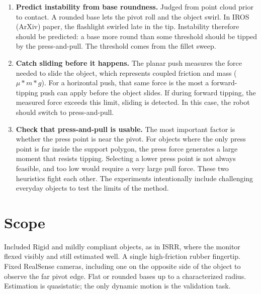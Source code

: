 \documentclass[10pt, conference]{IEEEtran}
\begin{document}
\begin{enumerate}[leftmargin=*, itemsep=2pt]
  \item \textbf{Predict instability from base roundness.} Judged from point cloud prior to contact. A rounded base lets the pivot roll and the object swirl. In IROS (ArXiv) paper, the flashlight swirled late in the tip. Instability therefore should be predicted: a base more round than some threshold should be tipped by the press-and-pull. The threshold comes from the fillet sweep.
  \item \textbf{Catch sliding before it happens.} The planar push measures the force needed to slide the object, which represents coupled friction and mass ($\mu*m*g$). For a horizontal push, that same force is the most a forward-tipping push can apply before the object slides. If during forward tipping, the measured force exceeds this limit, sliding is detected. In this case, the robot should switch to press-and-pull.
  \item \textbf{Check that press-and-pull is usable.} The most important factor is whether the press point is near the pivot. For objects where the only press point is far inside the support polygon, the press force generates a large moment that resists tipping. Selecting a lower press point is not always feasible, and too low would require a very large pull force. These two heuristics fight each other. The experiments intentionally include challenging everyday objects to test the limits of the method.
\end{enumerate}

\section{Scope}

\begin{keybox}{Included}
Rigid and mildly compliant objects, as in ISRR, where the monitor flexed visibly and still estimated well. A single high-friction rubber fingertip. Fixed RealSense cameras, including one on the opposite side of the object to observe the far pivot edge. Flat or rounded bases up to a characterized radius. Estimation is quasistatic;
the only dynamic motion is the validation task.
\end{keybox}
\end{document}
